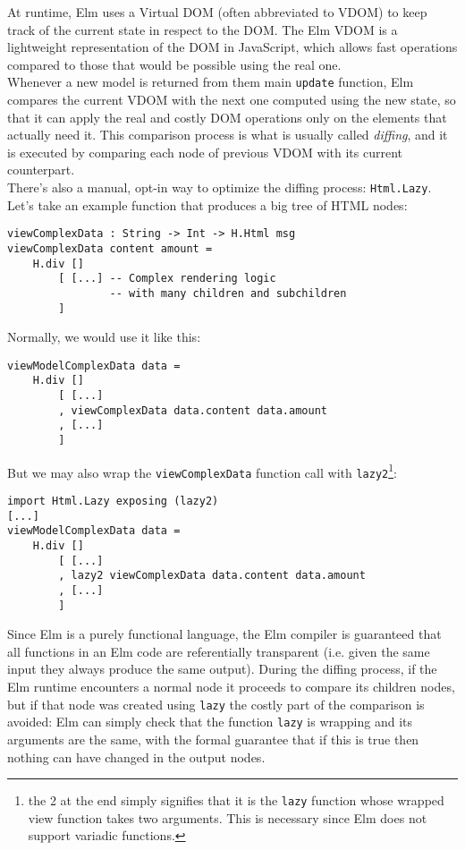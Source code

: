 At runtime, Elm uses a Virtual DOM (often abbreviated to VDOM) to keep track of the current state in respect to the DOM. The Elm VDOM is a lightweight representation of the DOM in JavaScript, which allows fast operations compared to those that would be possible using the real one. \cite{noauthor_htmllazy_nodate}\\

Whenever a new model is returned from them main \texttt{update} function, Elm compares the current VDOM with the next one computed using the new state, so that it can apply the real and costly DOM operations only on the elements that actually need it. This comparison process is what is usually called \textit{diffing}, and it is executed by comparing each node of previous VDOM with its current counterpart.\\

There's also a manual, opt-in way to optimize the diffing process: \texttt{Html.Lazy}. Let's take an example function that produces a big tree of HTML nodes:
\begin{verbatim}
viewComplexData : String -> Int -> H.Html msg
viewComplexData content amount =
    H.div []
        [ [...] -- Complex rendering logic 
                -- with many children and subchildren
        ]
\end{verbatim}

Normally, we would use it like this:
\begin{verbatim}
viewModelComplexData data =
    H.div []
        [ [...]
        , viewComplexData data.content data.amount
        , [...]
        ]
\end{verbatim}

But we may also wrap the \texttt{viewComplexData} function call with \texttt{lazy2}\footnote[1]{the 2 at the end simply signifies that it is the \texttt{lazy} function whose wrapped view function takes two arguments. This is necessary since Elm does not support variadic functions.}:
\begin{verbatim}
import Html.Lazy exposing (lazy2)
[...]
viewModelComplexData data =
    H.div []
        [ [...]
        , lazy2 viewComplexData data.content data.amount
        , [...]
        ]
\end{verbatim}


Since Elm is a purely functional language, the Elm compiler is guaranteed that all functions in an Elm code are referentially transparent (i.e. given the same input they always produce the same output). During the diffing process, if the Elm runtime encounters a normal node it proceeds to compare its children nodes, but if that node was created using \texttt{lazy} the costly part of the comparison is avoided: Elm can simply check that the function \texttt{lazy} is wrapping and its arguments are the same, with the formal guarantee that if this is true then nothing can have changed in the output nodes.

